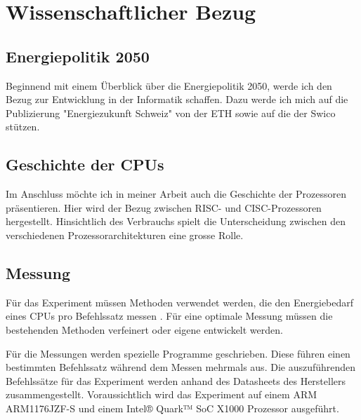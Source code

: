 \chapter{Wissenschaftlicher Bezug}

\section{Energiepolitik 2050}
Beginnend mit einem Überblick über die Energiepolitik 2050, werde ich den Bezug zur Entwicklung in der
Informatik schaffen. Dazu werde ich mich auf die Publizierung
"Energiezukunft Schweiz"\cite{eth_energiezukunft_schweiz} von der ETH sowie auf die\cite{swico_datenblatt}
der Swico stützen.

\section{Geschichte der CPUs}
Im Anschluss möchte ich in meiner Arbeit auch die Geschichte der Prozessoren präsentieren. Hier wird der Bezug
zwischen RISC- und CISC-Prozessoren hergestellt. Hinsichtlich des Verbrauchs spielt die Unterscheidung zwischen den verschiedenen 
Prozessorarchitekturen eine grosse Rolle.\cite{stanford_risc_cisc}


\section{Messung}
Für das Experiment müssen Methoden verwendet werden, die den Energiebedarf eines CPUs pro Befehlssatz messen
\cite{measuring_power_temperature, analysis_circuits, intel_epi}. Für eine optimale Messung müssen die bestehenden Methoden
verfeinert oder eigene entwickelt werden.
\par
Für die Messungen werden spezielle Programme geschrieben. Diese führen einen bestimmten Befehlssatz während dem Messen mehrmals aus.
Die auszuführenden Befehlssätze für das Experiment werden anhand des Datasheets des Herstellers zusammengestellt.
Voraussichtlich wird das Experiment auf einem ARM ARM1176JZF-S\cite{arm_datasheet} und einem Intel® Quark™ SoC
X1000 \cite{intel_datasheet} Prozessor ausgeführt.


